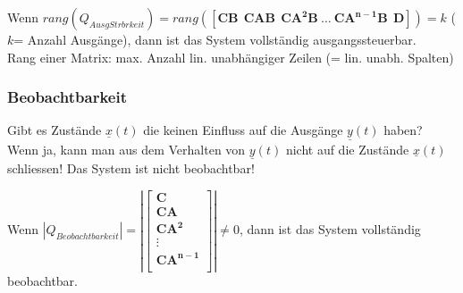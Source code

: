 Wenn $rang(Q_{AusgStrbrkeit}) = rang \left( \left [ \boldsymbol{CB~~ CAB~~ CA^2B~\ldots~
CA^{n-1}B ~~ D}\right ] \right) = k$ ($k$= Anzahl Ausgänge), dann ist das System vollständig ausgangssteuerbar. \\
Rang einer Matrix: max. Anzahl lin. unabhängiger Zeilen (= lin. unabh. Spalten)

\subsubsection{Beobachtbarkeit }
Gibt es Zustände $\underline{x}(t)$ die keinen Einfluss auf die Ausgänge
$\underline{y}(t)$ haben? Wenn ja, kann man aus dem Verhalten von 
$\underline{y}(t)$ nicht auf die Zustände $\underline{x}(t)$ schliessen!
Das System ist nicht beobachtbar!


Wenn $|Q_{Beobachtbarkeit}| = \left| \left [ \boldsymbol{
\begin{array}{c}
 C\\
 CA\\
CA^2\\
\vdots \\
CA^{n-1}\\
\end{array}}\right ] \right| \neq 0$, dann ist das System vollständig
beobachtbar.

